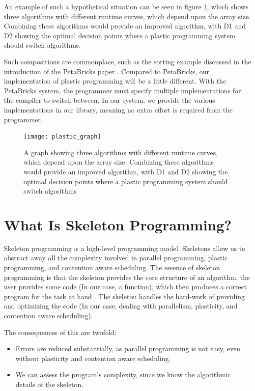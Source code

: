 An example of such a hypothetical situation can be seen in figure \ref{fig:plastic_graph}, which shows three algorithms with different runtime curves, which depend upon the array size. Combining these algorithms would provide an improved algorithm, with D1 and D2 showing the optimal decision points where a plastic programming system should switch algorithms.

Such compositions are commonplace, such as the sorting example discussed in the introduction of the PetaBricks paper \cite{petabricks}. Compared to PetaBricks, our implementation of plastic programming will be a little different. With the PetaBricks system, the programmer must specify multiple implementations for the compiler to switch between. In our system, we provide the various implementations in our library, meaning no extra effort is required from the programmer.



\begin{figure}
	\centering
	\texttt{[image: plastic\_graph]}
	\caption{A graph showing three algorithms with different runtime curves, which depend upon the array size. Combining these algorithms would provide an improved algorithm, with D1 and D2 showing the optimal decision points where a plastic programming system should switch algorithms}
	\label{fig:plastic_graph}
\end{figure}



\section{What Is Skeleton Programming?}
\label{section:background_what_is_skeleton_programming}

Skeleton programming is a high-level programming model. Skeletons allow us to abstract away all the complexity involved in parallel programming, plastic programming, and contention aware scheduling. The essence of skeleton programming is that the skeleton provides the core structure of an algorithm, the user provides some code (In our case, a function), which then produces a correct program for the task at hand \cite{patterns_and_frameworks}. The skeleton handles the hard-work of providing and optimizing the code (In our case, dealing with parallelism, plasticity, and contention aware scheduling). 

The consequences of this are twofold:

\begin{itemize}
	\item Errors are reduced substantially, as parallel programming is not easy, even without plasticity and contention aware scheduling.
	\item We can assess the program's complexity, since we know the algorithmic details of the skeleton.
\end{itemize}

